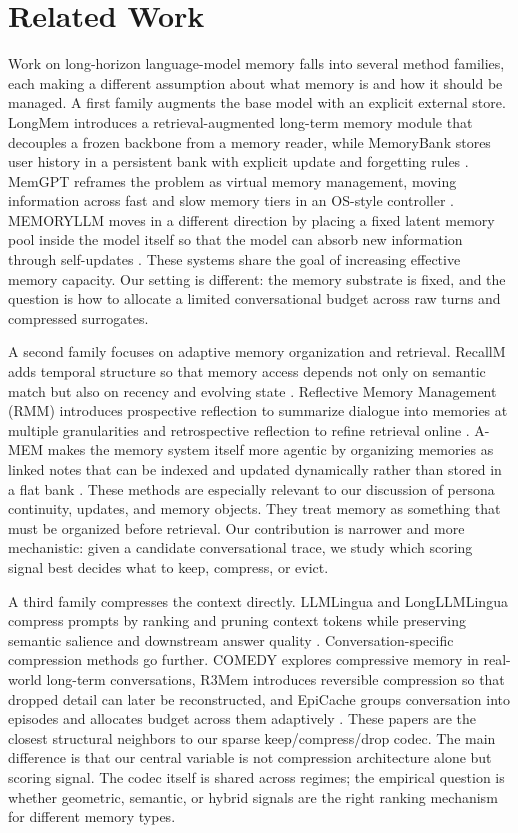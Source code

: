 \documentclass[conference]{IEEEtran}
\begin{document}
\section{Related Work}
Work on long-horizon language-model memory falls into several method families, each making a different assumption about what memory is and how it should be managed. A first family augments the base model with an explicit external store. LongMem introduces a retrieval-augmented long-term memory module that decouples a frozen backbone from a memory reader, while MemoryBank stores user history in a persistent bank with explicit update and forgetting rules \cite{longmem,memorybank}. MemGPT reframes the problem as virtual memory management, moving information across fast and slow memory tiers in an OS-style controller \cite{memgpt}. MEMORYLLM moves in a different direction by placing a fixed latent memory pool inside the model itself so that the model can absorb new information through self-updates \cite{memoryllm}. These systems share the goal of increasing effective memory capacity. Our setting is different: the memory substrate is fixed, and the question is how to allocate a limited conversational budget across raw turns and compressed surrogates.

A second family focuses on adaptive memory organization and retrieval. RecallM adds temporal structure so that memory access depends not only on semantic match but also on recency and evolving state \cite{recallm}. Reflective Memory Management (RMM) introduces prospective reflection to summarize dialogue into memories at multiple granularities and retrospective reflection to refine retrieval online \cite{rmm}. A-MEM makes the memory system itself more agentic by organizing memories as linked notes that can be indexed and updated dynamically rather than stored in a flat bank \cite{amem}. These methods are especially relevant to our discussion of persona continuity, updates, and memory objects. They treat memory as something that must be organized before retrieval. Our contribution is narrower and more mechanistic: given a candidate conversational trace, we study which scoring signal best decides what to keep, compress, or evict.

A third family compresses the context directly. LLMLingua and LongLLMLingua compress prompts by ranking and pruning context tokens while preserving semantic salience and downstream answer quality \cite{llmlingua,longllmlingua}. Conversation-specific compression methods go further. COMEDY explores compressive memory in real-world long-term conversations, R3Mem introduces reversible compression so that dropped detail can later be reconstructed, and EpiCache groups conversation into episodes and allocates budget across them adaptively \cite{comedy,r3mem,epicache}. These papers are the closest structural neighbors to our sparse keep/compress/drop codec. The main difference is that our central variable is not compression architecture alone but scoring signal. The codec itself is shared across regimes; the empirical question is whether geometric, semantic, or hybrid signals are the right ranking mechanism for different memory types.
\end{document}
